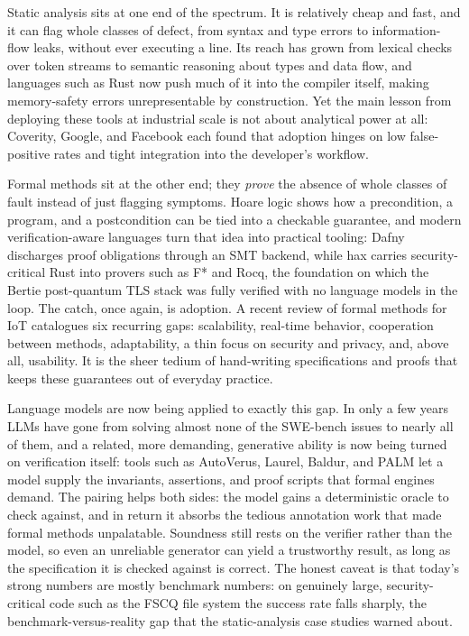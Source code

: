 \documentclass[conference]{IEEEtran}
\begin{document}
Static analysis sits at one end of the spectrum. It is relatively cheap and fast, and it can flag whole classes of defect, from syntax and type errors to information-flow leaks, without ever executing a line. Its reach has grown from lexical checks over token streams to semantic reasoning about types and data flow, and languages such as Rust now push much of it into the compiler itself, making memory-safety errors unrepresentable by construction. Yet the main lesson from deploying these tools at industrial scale is not about analytical power at all: Coverity, Google, and Facebook each found that adoption hinges on low false-positive rates and tight integration into the developer's workflow.

Formal methods sit at the other end; they \emph{prove} the absence of whole classes of fault instead of just flagging symptoms. Hoare logic shows how a precondition, a program, and a postcondition can be tied into a checkable guarantee, and modern verification-aware languages turn that idea into practical tooling: Dafny discharges proof obligations through an SMT backend, while hax carries security-critical Rust into provers such as F* and Rocq, the foundation on which the Bertie post-quantum TLS stack was fully verified with no language models in the loop. The catch, once again, is adoption. A recent review of formal methods for IoT catalogues six recurring gaps: scalability, real-time behavior, cooperation between methods, adaptability, a thin focus on security and privacy, and, above all, usability. It is the sheer tedium of hand-writing specifications and proofs that keeps these guarantees out of everyday practice.

Language models are now being applied to exactly this gap. In only a few years LLMs have gone from solving almost none of the SWE-bench issues to nearly all of them, and a related, more demanding, generative ability is now being turned on verification itself: tools such as AutoVerus, Laurel, Baldur, and PALM let a model supply the invariants, assertions, and proof scripts that formal engines demand. The pairing helps both sides: the model gains a deterministic oracle to check against, and in return it absorbs the tedious annotation work that made formal methods unpalatable. Soundness still rests on the verifier rather than the model, so even an unreliable generator can yield a trustworthy result, as long as the specification it is checked against is correct. The honest caveat is that today's strong numbers are mostly benchmark numbers: on genuinely large, security-critical code such as the FSCQ file system the success rate falls sharply, the benchmark-versus-reality gap that the static-analysis case studies warned about.
\end{document}
